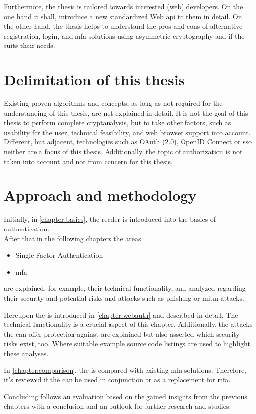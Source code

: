 Furthermore, the thesis is tailored towards interested (web) developers. On the one hand it shall, introduce a new standardized Web \gls{api} to them in detail. On the other hand, the thesis helps to understand the pros and cons of alternative registration, login, and \gls{mfa} solutions using asymmetric cryptography and if the \wa{} suits their needs.

\section{Delimitation of this thesis}

Existing proven algorithms and concepts, as long as not required for the understanding of this thesis, are not explained in detail. It is not the goal of this thesis to perform complete cryptanalysis, but to take other factors, such as usability for the user, technical feasibility, and web browser support into account. Different, but adjacent, technologies such as OAuth (2.0), OpenID Connect or \gls{sso} neither are a focus of this thesis. Additionally, the topic of authorization is not taken into account and not from concern for this thesis. 

\section{Approach and methodology}

Initially, in \autoref{chapter:basics}, the reader is introduced into the basics of authentication.\\
After that in the following chapters the areas

\begin{itemize}
	\item Single-Factor-Authentication
	\item \gls{mfa}
\end{itemize}

are explained, for example, their technical functionality, and analyzed regarding their security and potential risks and attacks such as phishing or \gls{mitm} attacks.

Hereupon the \wa{} is introduced in \autoref{chapter:webauth} and described in detail. The technical functionality is a crucial aspect of this chapter. Additionally, the attacks the \wa{} can offer protection against are explained but also asserted which security risks exist, too. Where suitable example source code listings are used to highlight these analyses.%

In \autoref{chapter:comparison}, the \wa{} is compared with existing \gls{mfa} solutions. Therefore, it's reviewed if the \wa{} can be used in conjunction or as a replacement for \gls{mfa}.

Concluding follows an evaluation based on the gained insights from the previous chapters with a conclusion and an outlook for further research and studies.
